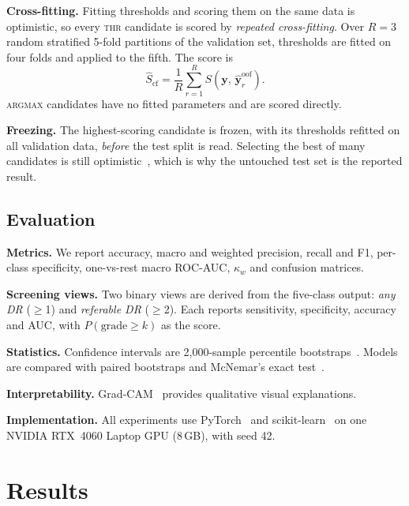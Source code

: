 \documentclass[journal]{IEEEtran}
\begin{document}
\textbf{Cross-fitting.} Fitting thresholds and scoring them on the same data is optimistic, so every
\textsc{thr} candidate is scored by \emph{repeated cross-fitting}. Over $R=3$ random stratified
5-fold partitions of the validation set, thresholds are fitted on four folds and applied to the
fifth. The score is
\begin{equation}
\hat{S}_{\mathrm{cf}}=\frac{1}{R}\sum_{r=1}^{R} S\!\left(\mathbf{y},\,\hat{\mathbf{y}}^{\mathrm{oof}}_r\right).
\end{equation}
\textsc{argmax} candidates have no fitted parameters and are scored directly.

\textbf{Freezing.} The highest-scoring candidate is frozen, with its thresholds refitted on all
validation data, \emph{before} the test split is read. Selecting the best of many candidates is still
optimistic~\cite{varma2006bias}, which is why the untouched test set is the reported result.

\subsection{Evaluation}
\textbf{Metrics.} We report accuracy, macro and weighted precision, recall and F1, per-class
specificity, one-vs-rest macro ROC-AUC, $\kappa_w$ and confusion matrices.

\textbf{Screening views.} Two binary views are derived from the five-class output: \emph{any DR}
($\geq$1) and \emph{referable DR} ($\geq$2). Each reports sensitivity, specificity, accuracy and AUC,
with $P(\text{grade}\geq k)$ as the score.

\textbf{Statistics.} Confidence intervals are 2{,}000-sample percentile
bootstraps~\cite{efron1994bootstrap}. Models are compared with paired bootstraps and McNemar's exact
test~\cite{mcnemar1947}.

\textbf{Interpretability.} Grad-CAM~\cite{selvaraju2017gradcam} provides qualitative visual
explanations.

\textbf{Implementation.} All experiments use PyTorch~\cite{paszke2019pytorch} and
scikit-learn~\cite{pedregosa2011sklearn} on one NVIDIA RTX~4060 Laptop GPU (8\,GB), with seed 42.

\section{Results}
\label{sec:results}
\end{document}

